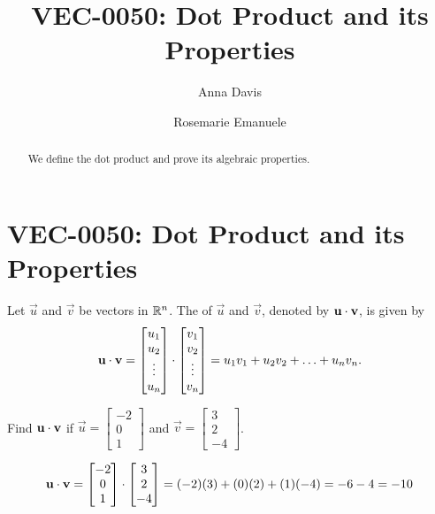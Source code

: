 \documentclass{ximera}
\author{Anna Davis \and Rosemarie Emanuele} \title{VEC-0050:  Dot Product and its Properties} \license{CC-BY 4.0}
\begin{document}
\begin{abstract}
  We define the dot product and prove its algebraic properties.
\end{abstract}
\maketitle

\section*{VEC-0050:  Dot Product and its Properties}

\begin{definition}\label{def:dotproduct}
  Let $\vec{u}$ and $\vec{v}$ be vectors in $\mathbb{R}^n$.  The  of $\vec{u}$ and $\vec{v}$, denoted by
  $\mathbf{u}\cdot \mathbf{v}$, is given by
  \begin{align*}
    \mathbf{u}\cdot\mathbf{v}=\begin{bmatrix}u_1\\u_2\\\vdots\\u_n\end{bmatrix}\cdot\begin{bmatrix}v_1\\v_2\\\vdots\\v_n\end{bmatrix}=u_1v_1+u_2v_2+\ldots+u_nv_n.
  \end{align*}
\end{definition}

\begin{example}\label{ex:dotex}
  Find $\mathbf{u}\cdot \mathbf{v}$ if
  $\vec{u}=\begin{bmatrix}-2\\0\\1\end{bmatrix}$ and
  $\vec{v}=\begin{bmatrix}3\\2\\-4\end{bmatrix}$.

  \begin{explanation}
    $$\mathbf{u}\cdot\mathbf{v}=\begin{bmatrix}-2\\0\\1\end{bmatrix}\cdot\begin{bmatrix}3\\2\\-4\end{bmatrix}=(-2)(3)+(0)(2)+(1)(-4)=-6-4=-10$$
  \end{explanation}
\end{example}
\end{document}
